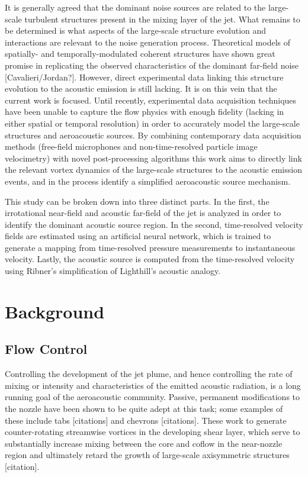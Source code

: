 It is generally agreed that the dominant noise sources are related to the large-scale turbulent structures present in the mixing layer of the jet. 
What remains to be determined is what aspects of the large-scale structure evolution and interactions are relevant to the noise generation process. 
Theoretical models of spatially- and temporally-modulated coherent structures have shown great promise in replicating the observed characteristics of the dominant far-field noise [Cavalieri/Jordan?]. 
However, direct experimental data linking this structure evolution to the acoustic emission is still lacking. 
It is on this vein that the current work is focused.
Until recently, experimental data acquisition techniques have been unable to capture the flow physics with enough fidelity (lacking in either spatial or temporal resolution) in order to accurately model the large-scale structures and aeroacoustic sources.
By combining contemporary data acquisition methods (free-field microphones and non-time-resolved particle image velocimetry) with novel post-processing algorithms this work aims to directly link the relevant vortex dynamics of the large-scale structures to the acoustic emission events, and in the process identify a simplified aeroacoustic source mechanism. 

This study can be broken down into three distinct parts. 
In the first, the irrotational near-field and acoustic far-field of the jet is analyzed in order to identify the dominant acoustic source region.
In the second, time-resolved velocity fields are estimated using an artificial neural network, which is trained to generate a mapping from time-resolved pressure measurements to instantaneous velocity.
Lastly, the acoustic source is computed from the time-resolved velocity using Ribner's simplification of Lighthill's acoustic analogy.  
	
\section{Background}
\subsection{Flow Control}
\label{sec:flow_instabilities}
Controlling the development of the jet plume, and hence controlling the rate of mixing or intensity and characteristics of the emitted acoustic radiation, is a long running goal of the aeroacoustic community.
Passive, permanent modifications to the nozzle have been shown to be quite adept at this task; some examples of these include tabs [citations] and chevrons [citations]. 
These work to generate counter-rotating streamwise vortices in the developing shear layer, which serve to substantially increase mixing between the core and coflow in the near-nozzle region and ultimately retard the growth of large-scale axisymmetric structures [citation].

